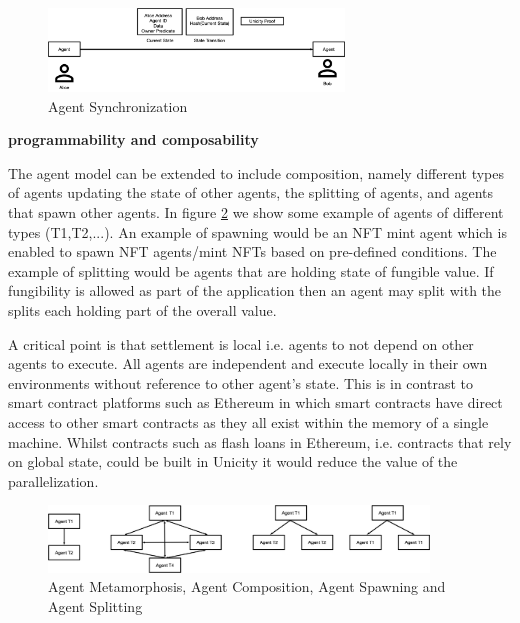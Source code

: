 \documentclass{article}
\begin{document}
\vspace{2mm}

\begin{figure}[H]
    \centering
    \includegraphics[width=0.7\textwidth]{AgentSynchronization.png}
    \caption{Agent Synchronization}
    \label{fig:AgentSynch}
\end{figure}

\vspace{2mm}

\textbf{programmability and composability}

\vspace{2mm}

The agent model can be extended to include composition, namely different types of agents updating the state of other agents, the splitting of agents, and agents that spawn other agents. In figure \ref{fig:AgentSpawn} we show some example of agents of different types (T1,T2,...). An example of spawning would be an NFT mint agent which is enabled to spawn NFT agents/mint NFTs based on pre-defined conditions. The example of splitting would be agents that are holding state of fungible value. If fungibility is allowed as part of the application then an agent may split with the splits each holding part of the overall value. 

\vspace{2mm}

A critical point is that settlement is local i.e. agents to not depend on other agents to execute. All agents are independent and execute locally in their own environments without reference to other agent's state. This is in contrast to smart contract platforms such as Ethereum in which  smart contracts have direct access to other smart contracts as they all exist within the memory of a single machine. Whilst contracts such as flash loans in Ethereum, i.e. contracts that rely on global state, could be built in Unicity it would reduce the value of the parallelization.


\begin{figure}[H]
    \centering
    \includegraphics[width=0.9\textwidth]{AgentSpawn.png}
    \caption{Agent Metamorphosis, Agent Composition, Agent Spawning and Agent Splitting}
    \label{fig:AgentSpawn}
\end{figure}
\end{document}
